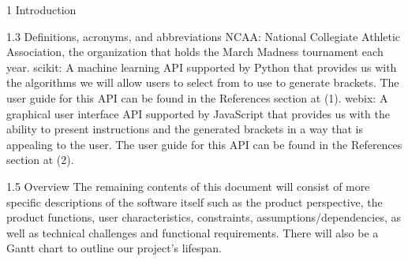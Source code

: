 \documentclass[letterpaper, 10pt,titlepage]{article}
\begin{document}
\begin{section}{1 Introduction}
\begin{subsection}{1.3 Definitions, acronyms, and abbreviations}
NCAA: National Collegiate Athletic Association, the organization that holds the March Madness tournament each year.
scikit: A machine learning API supported by Python that provides us with the algorithms we will allow users to select from to use to generate brackets. The user guide for this API can be found in the References section at (1).
webix: A graphical user interface API supported by JavaScript that provides us with the ability to present instructions and the generated brackets in a way that is appealing to the user. The user guide for this API can be found in the References section at (2).
\end{subsection}



\begin{subsection}{1.5 Overview}
The remaining contents of this document will consist of more specific descriptions of the software itself such as the product perspective, the product functions, user characteristics, constraints, assumptions/dependencies, as well as technical challenges and functional requirements. There will also be a Gantt chart to outline our project's lifespan.
\end{subsection}

\end{section}
\end{document}
